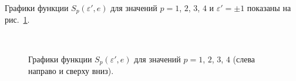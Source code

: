 \documentclass[14pt,a4paper%
]{extarticle}
\begin{document}
Графики функции $S_p(\varepsilon',e)$ для значений $p=1$, $2$, $3$, $4$ и $\varepsilon'=\pm1$ показаны на рис.~\ref{fig:Sp}.

\begin{figure}[H]
\centering
{}
\hfill
{}\\
\hfill
{}
\caption{Графики функции $S_p(\varepsilon',e)$ для значений $p=1$, $2$, $3$, $4$ (слева направо и сверху вниз). 
}
\label{fig:Sp}
\end{figure}
\end{document}
